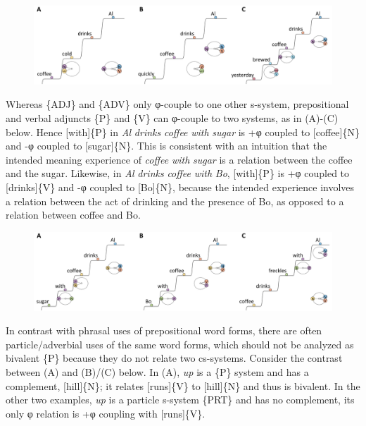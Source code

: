   
\begin{figure}
\includegraphics[width=\textwidth]{figures/Tilsen-img83.png}
\caption{\missingcaption}
\label{fig:}
\end{figure}
 

  Whereas \{ADJ\} and \{ADV\} only φ-couple to one other s-system, prepositional and verbal adjuncts \{P\} and \{V\} can φ-couple to two systems, as in (A)-(C) below. Hence [with]\{P\} in \textit{Al} \textit{drinks} \textit{coffee} \textit{with} \textit{sugar} is +φ coupled to [coffee]\{N\} and -φ coupled to [sugar]\{N\}. This is consistent with an intuition that the intended meaning experience of \textit{coffee} \textit{with} \textit{sugar} is a relation between the coffee and the sugar. Likewise, in \textit{Al} \textit{drinks} \textit{coffee} \textit{with} \textit{Bo}, [with]\{P\} is +φ coupled to [drinks]\{V\} and -φ coupled to [Bo]\{N\}, because the intended experience involves a relation between the act of drinking and the presence of Bo, as opposed to a relation between coffee and Bo.

  
\begin{figure}
\includegraphics[width=\textwidth]{figures/Tilsen-img84.png}
\caption{\missingcaption}
\label{fig:}
\end{figure}
 

  In contrast with phrasal uses of prepositional word forms, there are often particle/adverbial uses of the same word forms, which should not be analyzed as bivalent \{P\} because they do not relate two cs-systems. Consider the contrast between (A) and (B)/(C) below. In (A), \textit{up} is a \{P\} system and has a complement, [hill]\{N\}; it relates [runs]\{V\} to [hill]\{N\} and thus is bivalent. In the other two examples, \textit{up} is a particle s-system \{PRT\} and has no complement, its only φ relation is +φ coupling with [runs]\{V\}.

